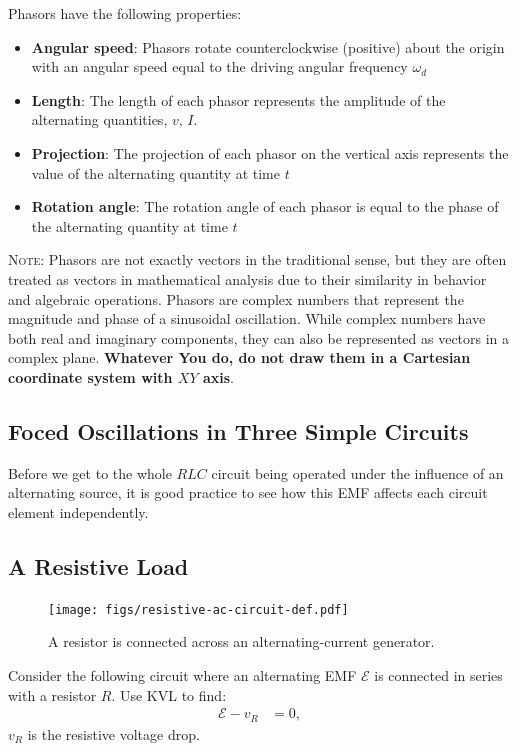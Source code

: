 \documentclass[12pt,b4paper]{article}
\begin{document}
Phasors have the following properties:
\begin{itemize}
\setlength{\itemsep}{0pt}
    \item \textbf{Angular speed}: Phasors rotate counterclockwise (positive) about the origin with an angular speed equal to the driving angular frequency $\omega_d$
    \item \textbf{Length}: The length of each phasor represents the amplitude of the alternating quantities, $v,\,I$.
    \item \textbf{Projection}: The projection of each phasor on the vertical axis represents the value of the alternating quantity at time $t$
    \item \textbf{Rotation angle}: The rotation angle of each phasor is equal to the phase of the alternating quantity at time $t$
\end{itemize}
\textsc{Note}: Phasors are not exactly vectors in the traditional sense, but they are often treated as vectors in mathematical analysis due to their similarity in behavior and algebraic operations. Phasors are complex numbers that represent the magnitude and phase of a sinusoidal oscillation. While complex numbers have both real and imaginary components, they can also be represented as vectors in a complex plane. \textbf{Whatever You do, do not draw them in a Cartesian coordinate system with $XY$ axis}.
\subsection{Foced Oscillations in Three Simple Circuits}
Before we get to the whole $RLC$ circuit being operated under the influence of an alternating source, it is good practice to see how this EMF affects each circuit element independently.
\subsection*{A Resistive Load}
\begin{figure}[H]
    \centering
    \texttt{[image: figs/resistive-ac-circuit-def.pdf]}
    \caption{A resistor is connected across an alternating-current generator.}
    \label{fig:resistive-ac-circuit-def}
\end{figure}
Consider the following circuit where an alternating EMF $\mathcal{E}$ is connected in series with a resistor $R$. Use KVL to find:
\begin{align}
    \mathcal{E}-v_R&=0,
\end{align}
$v_R$ is the resistive voltage drop.
\end{document}
